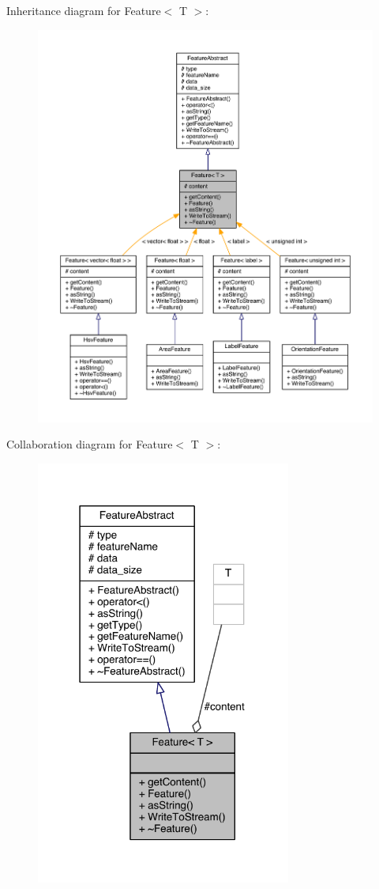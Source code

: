 Inheritance diagram for Feature$<$ T $>$\+:
\nopagebreak
\begin{figure}[H]
\begin{center}
\leavevmode
\includegraphics[width=350pt]{class_feature__inherit__graph}
\end{center}
\end{figure}


Collaboration diagram for Feature$<$ T $>$\+:\nopagebreak
\begin{figure}[H]
\begin{center}
\leavevmode
\includegraphics[width=238pt]{class_feature__coll__graph}
\end{center}
\end{figure}


